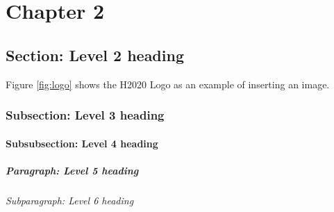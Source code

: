 
\chapter{Chapter 2}

\section{Section: Level 2 heading}


Figure \ref{fig:logo} shows the H2020 Logo as an example of inserting an image.

\subsection{Subsection: Level 3 heading}
\subsubsection{Subsubsection: Level 4 heading}
\paragraph{Paragraph: Level 5 heading}
\subparagraph{Subparagraph: Level 6 heading}

